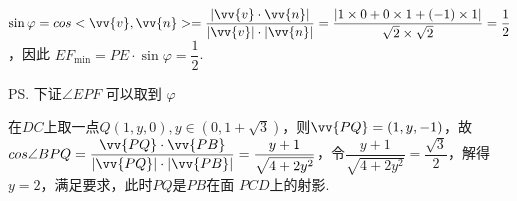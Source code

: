 \begin{enumerate}
\begin{jieda}
        $\sin \varphi = cos<\vv{v}, \vv{n}> = \dfrac{\left| \vv{v} \cdot  \vv{n}\right| }{\left| \vv{v}\right|  \cdot  \left| \vv{n}\right| } = \dfrac{\left| 1 \times  0 + 0 \times  1 + \left( -1\right)  \times  1\right| }{\sqrt{2} \times  \sqrt{2}} = \dfrac{1}{2}$，因此 $E{F}_{\min } = {PE} \cdot  \sin \varphi  = \dfrac{1}{2}$.

        \ps 下证$\angle {EPF}$ 可以取到 $\varphi$
        
        在$DC$上取一点$Q(1, y, 0), y \in (0, 1+\sqrt{3})$，则$\vv{PQ} = (1,y,-1)$，故$cos\angle BPQ = \dfrac{\vv{PQ} \cdot \vv{PB}}{|\vv{PQ}| \cdot |\vv{PB}|} = \dfrac{y+1}{\sqrt{4+2y^2}}$，令$\dfrac{y+1}{\sqrt{4+2y^2}} = \dfrac{\sqrt{3}}{2}$，解得$y = 2$，满足要求，此时$PQ$是$PB$在面 ${PCD}$上的射影.
    \end{jieda}
\end{enumerate}